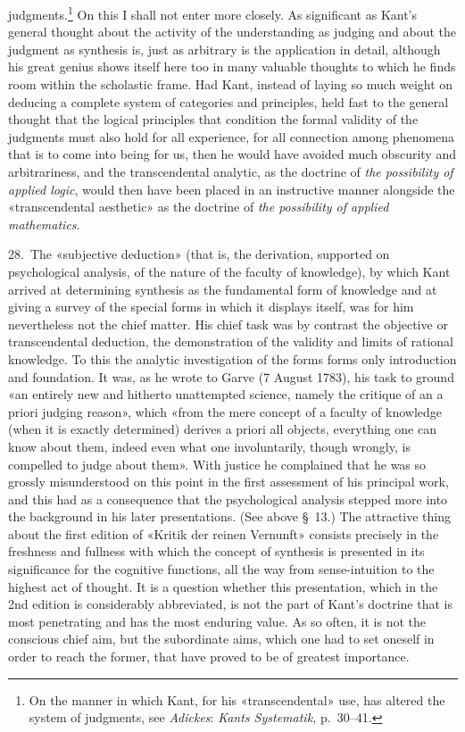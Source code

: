 \documentclass[12pt,a4paper]{article}
\newcommand{\opage}[1]{\marginnote{\footnotesize\textit{[#1]}}}
\begin{document}
judgments.\footnote{On the manner in which Kant, for his «transcendental»
use, has altered the system of judgments, see \emph{Adickes}: \textit{Kants
Systematik,} p.\ 30--41.} On this I shall not enter more closely. As
significant as Kant's general thought about the activity of the understanding
as judging and about the judgment as synthesis is, just as arbitrary is the
application in detail, although his great genius shows itself here too in many
valuable thoughts to which he finds room within the scholastic frame. Had
Kant, instead of laying so much weight on deducing a complete system of
categories and principles, held fast to the general thought that the logical
principles that condition the formal validity of the judgments must also hold
for all experience, for all connection among phenomena that is to come into
being for us, then he would have avoided much obscurity and arbitrariness,
and the transcendental analytic, as the doctrine of \emph{the possibility of
applied logic}, would then have been placed in an instructive manner alongside
the «transcendental aesthetic» as the doctrine of \emph{the possibility of applied
mathematics}.

28.\ The «subjective deduction» (that is, the derivation, supported on
psychological analysis, of the nature of the faculty of knowledge), by which
Kant arrived at determining synthesis as the fundamental form of knowledge and
at giving a survey of the special forms in which it displays itself, was for
him nevertheless not the chief matter. His chief task was by contrast the
objective or transcendental deduction, the demonstration of the validity and
limits of rational knowledge. To this the analytic investigation of the forms
forms only introduction and foundation. It was, as he wrote to Garve (7 August
1783), his task to ground «an entirely new and hitherto unattempted science,
namely the critique of an a priori judging reason», which «from the mere
concept of a faculty of knowledge (when it is exactly determined) derives a
priori all objects, everything one can know about them, indeed even what one
involuntarily, though wrongly, is compelled to judge about them». With
justice \opage{56}he complained that he was so grossly misunderstood on this point in
the first assessment of his principal work, and this had as a consequence
that the psychological analysis stepped more into the background in his later
presentations. (See above §\ 13.) The attractive thing about the first
edition of «Kritik der reinen Vernunft» consists precisely in the freshness
and fullness with which the concept of synthesis is presented in its
significance for the cognitive functions, all the way from sense-intuition to
the highest act of thought. It is a question whether this presentation, which
in the 2nd edition is considerably abbreviated, is not the part of Kant's
doctrine that is most penetrating and has the most enduring value. As so
often, it is not the conscious chief aim, but the subordinate aims, which one
had to set oneself in order to reach the former, that have proved to be of
greatest importance.
\end{document}
